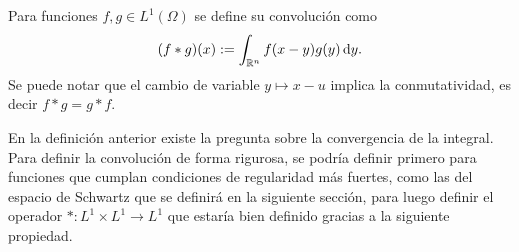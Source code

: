 \begin{definition}[Convoluciones]
    Para funciones $f,g\in L^1(\Omega)$ se define su convolución como 
    \begin{equation*}
        (f*g)(x) := \int_{\mathbb{R}^n} f(x-y)g(y)\mathop{}\!\mathrm{d} y.
    \end{equation*}
    Se puede notar que el cambio de variable $y\mapsto x-u$ implica la
    conmutatividad, es decir $f*g=g*f$.
\end{definition}
\begin{remark}
    En la definición anterior existe la pregunta sobre la convergencia de la
    integral. Para definir la convolución de forma rigurosa, se podría definir 
    primero para funciones que cumplan condiciones de regularidad más 
    fuertes, como las del espacio de Schwartz que se definirá en la siguiente
    sección, para luego definir el operador $*:L^1\times L^1 \rightarrow L^1$
    que estaría bien definido gracias a la siguiente propiedad.
\end{remark}

